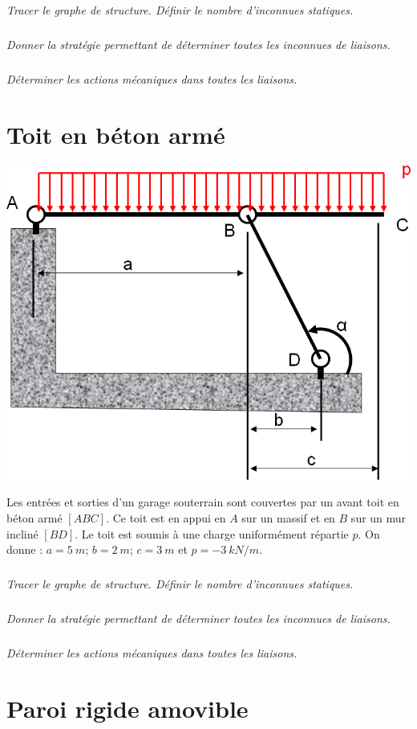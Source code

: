 \documentclass[10pt,fleqn]{article} %
\begin{document}
\begin{multicols}{2}
\subparagraph{}\textit{Tracer le graphe de structure. Définir le nombre d'inconnues statiques.}

\subparagraph{}\textit{Donner la stratégie permettant de déterminer toutes les inconnues de liaisons.}

\subparagraph{}\textit{Déterminer les actions mécaniques dans toutes les liaisons.}


\section*{Toit en béton armé}
\setcounter{exo}{0}
\begin{center}
\includegraphics[width=.9\linewidth]{images/fig_03}
\end{center}

Les entrées et sorties d’un garage souterrain sont couvertes par un avant toit en béton armé $[ABC]$. Ce toit est en appui en $A$ sur un massif et en $B$ sur un mur incliné $[BD]$. Le toit est soumis à une charge uniformément répartie $p$. On donne :
$a=\SI{5}{m}$; $b=\SI{2}{m}$; $c=\SI{3}{m}$ et $p=\SI{-3}{kN/m}$.


\subparagraph{}\textit{Tracer le graphe de structure. Définir le nombre d'inconnues statiques.}

\subparagraph{}\textit{Donner la stratégie permettant de déterminer toutes les inconnues de liaisons.}

\subparagraph{}\textit{Déterminer les actions mécaniques dans toutes les liaisons.}



\section*{Paroi rigide amovible}
\setcounter{exo}{0}


\end{multicols}
\end{document}
